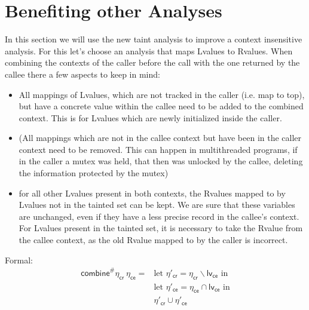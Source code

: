   \section{Benefiting other Analyses}
  In this section we will use the new taint analysis to improve a context insensitive analysis. For this let's choose an analysis that maps Lvalues to Rvalues.
  When combining the contexts of the caller before the call with the one returned by the callee there a few aspects to keep in mind:
  \begin{itemize}
    \item All mappings of Lvalues, which are not tracked in the caller (i.e. map to top), but have a concrete value within the callee need to be added to the combined context. This is for Lvalues which are newly initialized inside the caller.
    \item (All mappings which are not in the callee context but have been in the caller context need to be removed. This can happen in multithreaded programs, if in the caller a mutex was held, that then was unlocked by the callee, deleting the information protected by the mutex)
    \item for all other Lvalues present in both contexts, the Rvalues mapped to by Lvalues not in the tainted set can be kept. We are sure that these variables are unchanged, even if they have a less precise record in the callee's context. For Lvalues present in the tainted set, it is necessary to take the Rvalue from the callee context, as the old Rvalue mapped to by the caller is incorrect.
  \end{itemize}

  Formal:\\

  \begin{align}
    \textsf{combine}^{\#} \eta_\textsf{cr}\ \eta_\textsf{ce} = & \text{let } \eta'_\textsf{cr} = \eta_\textsf{cr} \backslash \textsf{lv}_\textsf{ce} \text{ in} \\
    & \text{let } \eta'_\textsf{ce} = \eta_\textsf{ce} \cap \textsf{lv}_\textsf{ce} \text{ in} \\
    & \eta'_\textsf{cr} \cup \eta'_\textsf{ce}
  \end{align}


